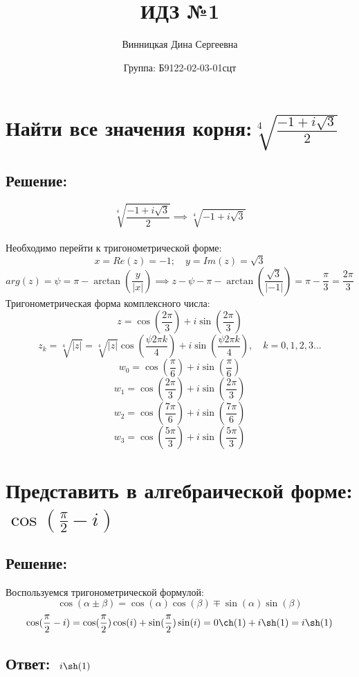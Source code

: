 \documentclass{article}
\title{\vspace{-1cm}ИДЗ №1}
\author{Винницкая Дина Сергеевна}
\date{Группа: Б9122-02-03-01сцт}
\begin{document}
	
	\maketitle

	\section{Найти все значения корня:$\sqrt[4]{\frac{-1 + i\sqrt{3}}{2}}$}
	\subsection{Решение:}
        $$\sqrt[4]{\frac{-1 + i\sqrt{3}}{2}} \implies \sqrt[4]{-1 + i\sqrt{3}}  $$\\
        Необходимо перейти к тригонометрической форме: \\
        $$x = Re(z) = -1; \quad y = Im(z) =  \sqrt{3} $$
        $$arg(z) = \psi = \pi - \arctan(\frac{y}{|x|}) \implies z - \psi - \pi - \arctan(\frac{\sqrt{3}}{|-1|}) = \pi - \frac{\pi}{3} = \frac{2\pi}{3}$$
        Тригонометрическая форма комплексного числа: \\
        $$z = \cos(\frac{2\pi}{3}) + i\sin(\frac{2\pi}{3})$$ 
        $$z_k = \sqrt[4]{|z|} =  \sqrt[4]{|z|} \cos(\frac{\psi 2 \pi k}{4}) + i\sin(\frac{\psi 2 \pi k}{4}),\quad k = 0,1,2,3 ... $$ 
        $$w_0 = \cos(\frac{\pi}{6}) + i\sin(\frac{\pi}{6})$$
        $$w_1 = \cos(\frac{2\pi}{3}) + i\sin(\frac{2\pi}{3})$$
        $$w_2 = \cos(\frac{7\pi}{6}) + i\sin(\frac{7\pi}{6})$$
        $$w_3 = \cos(\frac{5\pi}{3}) + i\sin(\frac{5\pi}{3})$$

        \section{Представить в алгебраической форме: $\cos(\frac{\pi}{2}- i)$}
        \subsection{Решение:}
        Воспользуемся тригонометрической формулой: \\
        $$\cos(\alpha \pm \beta) = \cos(\alpha) \cos(\beta) \mp \sin(\alpha)\sin(\beta)$$ 
        $$\cos(\frac{\pi}{2}- i) = \cos(\frac{\pi}{2}) \cos(i) + \sin(\frac{\pi}{2}) \sin(i) = 0 \ch(1) + i\sh(1) = i\sh(1)$$
        
	\subsection{Ответ:$\quad i\sh(1)$}
\end{document}
